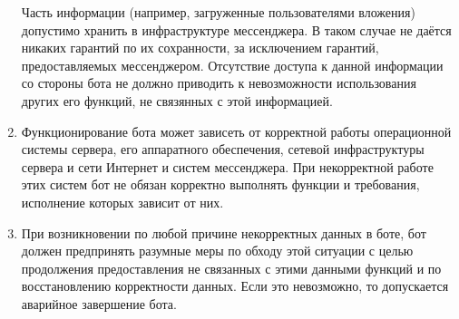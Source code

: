 \begin{enumerate}
            Часть информации (например, загруженные пользователями вложения) допустимо хранить в
            инфраструктуре мессенджера. В таком случае не даётся никаких гарантий по их сохранности,
            за исключением гарантий, предоставляемых мессенджером. Отсутствие доступа
            к данной информации со стороны бота не должно приводить к невозможности использования
            других его функций, не связянных с этой информацией.
        \item
            Функционирование бота может зависеть от корректной работы операционной системы сервера,
            его аппаратного обеспечения, сетевой инфраструктуры сервера и сети Интернет и систем мессенджера.
            При некорректной работе этих систем бот не обязан корректно выполнять функции и требования,
            исполнение которых зависит от них.
        \item
            При возникновении по любой причине некорректных данных в боте, бот должен предпринять
            разумные меры по обходу этой ситуации с целью продолжения предоставления не связанных
            с этими данными функций и по восстановлению корректности данных. Если это невозможно,
            то допускается аварийное завершение бота.
    \end{enumerate}

